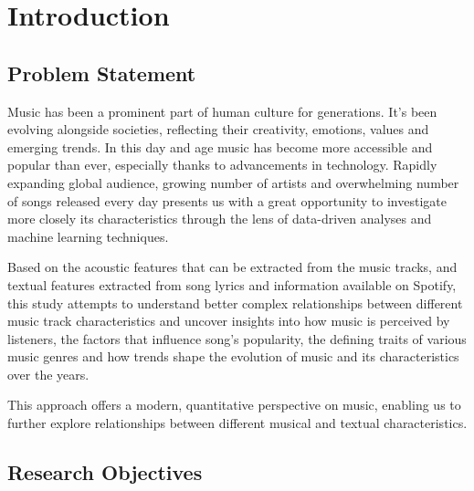 \chapter{Introduction}
\label{cha:introduction}

\section{Problem Statement}
\label{sec:problemstatement}
Music has been a prominent part of human culture for generations. It's been
evolving alongside societies, reflecting their creativity, emotions, values and
emerging trends. In this day and age music has become more accessible and
popular than ever, especially thanks to advancements in technology. Rapidly
expanding global audience, growing number of artists and overwhelming number of
songs released every day presents us with a great opportunity to investigate
more closely its characteristics through the lens of data-driven analyses and
machine learning techniques. 

Based on the acoustic features that can be extracted from the music tracks, and
textual features extracted from song lyrics and information available on
Spotify, this study attempts to understand better complex relationships between
different music track characteristics and uncover insights into how music is
perceived by listeners, the factors that influence song's popularity, the
defining traits of various music genres and how trends shape the evolution of
music and its characteristics over the years. 

This approach offers a modern, quantitative perspective on music, enabling us
to further explore relationships between different musical and textual
characteristics.






\section{Research Objectives}
\label{sec:researchquestions}

